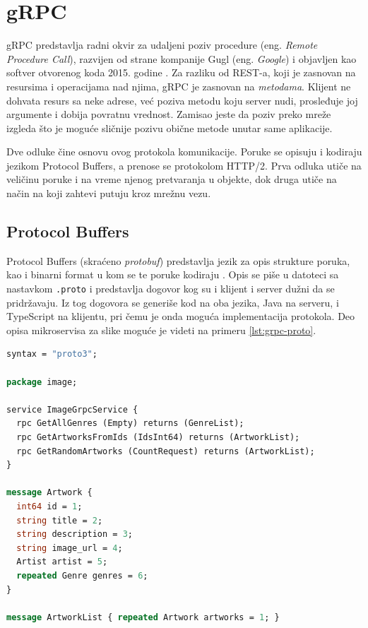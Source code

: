 \documentclass[12pt,oneside]{memoir}
\begin{document}
\section{gRPC}

gRPC predstavlja radni okvir za udaljeni poziv procedure (eng. \textit{Remote Procedure Call}),
razvijen od strane kompanije Gugl (eng. \textit{Google}) i objavljen kao softver otvorenog koda
2015. godine \cite{grpc-docs}. Za razliku od REST-a, koji je zasnovan na resursima i
operacijama nad njima, gRPC je zasnovan na \emph{metodama}. Klijent ne dohvata resurs sa neke
adrese, već poziva metodu koju server nudi, prosleđuje joj argumente i dobija povratnu vrednost.
Zamisao jeste da poziv preko mreže izgleda što je moguće sličnije pozivu obične metode unutar
same aplikacije.

Dve odluke čine osnovu ovog protokola komunikacije. Poruke se opisuju i kodiraju jezikom Protocol Buffers,
a prenose se protokolom HTTP/2. Prva odluka utiče na veličinu poruke i na vreme njenog
pretvaranja u objekte, dok druga utiče na način na koji zahtevi putuju kroz mrežnu vezu.

\subsection{Protocol Buffers}

Protocol Buffers (skraćeno \textit{protobuf}) predstavlja jezik za opis strukture poruka, kao i
binarni format u kom se te poruke kodiraju \cite{protobuf}. Opis se piše u datoteci sa nastavkom
\texttt{.proto} i predstavlja dogovor kog su i klijent i server dužni da se pridržavaju. Iz tog 
dogovora se generiše kod na oba jezika, Java na serveru, i TypeScript na klijentu, pri čemu je onda moguća implementacija 
protokola. Deo opisa mikroservisa za slike moguće je videti na primeru
\ref{lst:grpc-proto}.

\begin{lstlisting}[language=Protobuf,
  caption={Deo opisa mikroservisa za slike u jeziku Protocol Buffers},
  label={lst:grpc-proto}]
syntax = "proto3";

package image;

service ImageGrpcService {
  rpc GetAllGenres (Empty) returns (GenreList);
  rpc GetArtworksFromIds (IdsInt64) returns (ArtworkList);
  rpc GetRandomArtworks (CountRequest) returns (ArtworkList);
}

message Artwork {
  int64 id = 1;
  string title = 2;
  string description = 3;
  string image_url = 4;
  Artist artist = 5;
  repeated Genre genres = 6;
}

message ArtworkList { repeated Artwork artworks = 1; }
\end{lstlisting}
\end{document}
